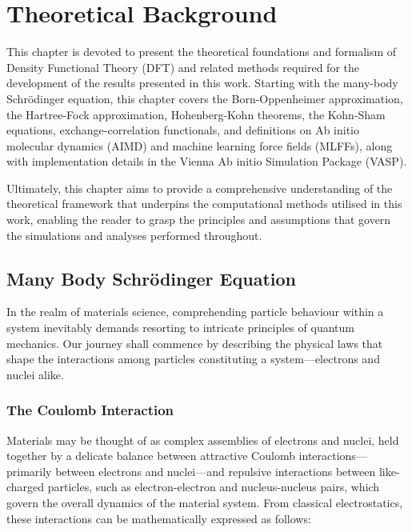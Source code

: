 
\chapter{Theoretical Background} %

\label{Chapter2} %

This chapter is devoted to present the theoretical foundations and formalism of Density Functional Theory (DFT) and related methods required for the development of the results presented in this work. Starting with the many-body Schrödinger equation, this chapter covers the Born-Oppenheimer approximation, the Hartree-Fock approximation, Hohenberg-Kohn theorems, the Kohn-Sham equations, exchange-correlation functionals, and definitions on Ab initio molecular dynamics (AIMD) and machine learning force fields (MLFFs), along with implementation details in the Vienna Ab initio Simulation Package (VASP).

Ultimately, this chapter aims to provide a comprehensive understanding of the theoretical framework that underpins the computational methods utilised in this work, enabling the reader to grasp the principles and assumptions that govern the simulations and analyses performed throughout.

\section{Many Body Schrödinger Equation}
In the realm of materials science, comprehending particle behaviour within a system inevitably demands resorting to intricate principles of quantum mechanics. Our journey shall commence by describing the physical laws that shape the interactions among particles constituting a system---electrons and nuclei alike. 

\subsection{The Coulomb Interaction}

Materials may be thought of as complex assemblies of electrons and nuclei, held together by a delicate balance between attractive Coulomb interactions---primarily between electrons and nuclei---and repulsive interactions between like-charged particles, such as electron-electron and nucleus-nucleus pairs, which govern the overall dynamics of the material system\supercite{giustino2014materials, sholl2023density, kaxiras2003atomic}.  From classical electrostatics, these interactions can be mathematically expressed as follows: 

